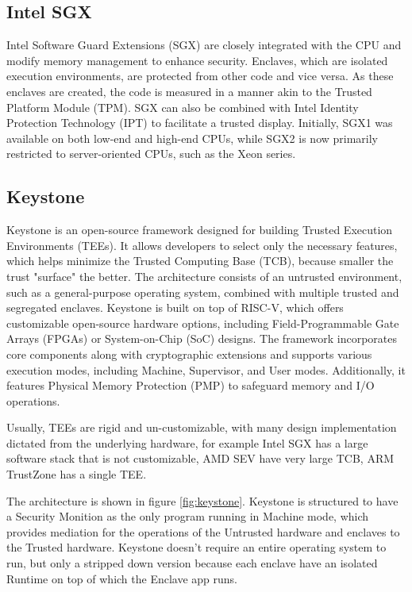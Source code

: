 \subsection{Intel SGX}

Intel Software Guard Extensions (SGX) are closely integrated with 
the CPU and modify memory management to enhance security. 
Enclaves, which are isolated execution environments, are protected 
from other code and vice versa. As these enclaves are created, 
the code is measured in a manner akin to the Trusted Platform 
Module (TPM). SGX can also be combined with Intel Identity 
Protection Technology (IPT) to facilitate a trusted display. 
Initially, SGX1 was available on both low-end and high-end CPUs, 
while SGX2 is now primarily restricted to server-oriented CPUs, 
such as the Xeon series.

\subsection{Keystone}

Keystone is an open-source framework designed for building Trusted
Execution Environments (TEEs). It allows developers to select only the
necessary features, which helps minimize the Trusted Computing Base
(TCB), because smaller the trust "surface" the better. The
architecture consists of an untrusted environment, such as a
general-purpose operating system, combined with multiple trusted and
segregated enclaves. Keystone is built on top of RISC-V, which offers
customizable open-source hardware options, including
Field-Programmable Gate Arrays (FPGAs) or System-on-Chip (SoC)
designs. The framework incorporates core components along with
cryptographic extensions and supports various execution modes,
including Machine, Supervisor, and User modes. Additionally, it
features Physical Memory Protection (PMP) to safeguard memory and I/O
operations.

Usually, TEEs are rigid and un-customizable, with many design
implementation dictated from the underlying hardware, for example
Intel SGX has a large software stack that is not customizable, AMD SEV
have very large TCB, ARM TrustZone has a single TEE. 

The architecture is shown in figure \ref{fig:keystone}. Keystone is
structured to have a Security Monition as the only program running in
Machine mode, which provides mediation for the operations of the 
Untrusted hardware and enclaves to the Trusted hardware.
Keystone doesn't require an entire operating system to run, but only
a stripped down version because each enclave have an isolated Runtime
on top of which the Enclave app runs.

